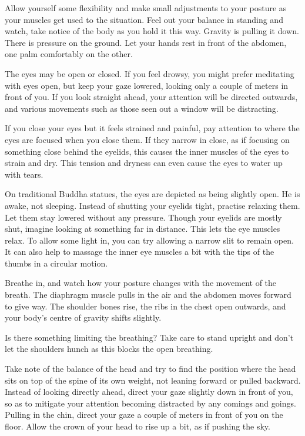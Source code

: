 Allow yourself some flexibility and make small adjustments to your
posture as your muscles get used to the situation. Feel out your balance
in standing and watch, take notice of the body as you hold it this way.
Gravity is pulling it down. There is pressure on the ground. Let your
hands rest in front of the abdomen, one palm comfortably on the other.

The eyes may be open or closed. If you feel drowsy, you might prefer
meditating with eyes open, but keep your gaze lowered, looking only a
couple of meters in front of you. If you look straight ahead, your
attention will be directed outwards, and various movements such as those
seen out a window will be distracting.

If you close your eyes but it feels strained and painful, pay attention
to where the eyes are focused when you close them. If they narrow in
close, as if focusing on something close behind the eyelids, this causes
the inner muscles of the eyes to strain and dry. This tension and
dryness can even cause the eyes to water up with tears.

On traditional Buddha statues, the eyes are depicted as being slightly
open. He is awake, not sleeping. Instead of shutting your eyelids tight,
practise relaxing them. Let them stay lowered without any pressure.
Though your eyelids are mostly shut, imagine looking at something far in
distance. This lets the eye muscles relax. To allow some light in, you
can try allowing a narrow slit to remain open. It can also help to
massage the inner eye muscles a bit with the tips of the thumbs in a
circular motion.

Breathe in, and watch how your posture changes with the movement of the
breath. The diaphragm muscle pulls in the air and the abdomen moves
forward to give way. The shoulder bones rise, the ribs in the chest open
outwards, and your body's centre of gravity shifts slightly.

Is there something limiting the breathing? Take care to stand upright
and don't let the shoulders hunch as this blocks the open breathing.

Take note of the balance of the head and try to find the position where
the head sits on top of the spine of its own weight, not leaning forward
or pulled backward. Instead of looking directly ahead, direct your gaze
slightly down in front of you, so as to mitigate your attention becoming
distracted by any comings and goings. Pulling in the chin, direct your
gaze a couple of meters in front of you on the floor. Allow the crown of
your head to rise up a bit, as if pushing the sky.

